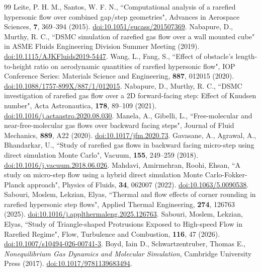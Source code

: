 \documentclass[aip,pof,preprint,notitlepage,floatfix,amsmath,amssymb]{revtex4-2}
\begin{document}
\begin{thebibliography}{99}
 Leite, P. H. M., Santos, W. F. N., ``Computational analysis of a rarefied hypersonic flow over combined gap/step geometries", Advances in Aerospace Sciences, \textbf{7}, 369--394 (2015). \href{https://doi.org/10.1051/eucass/201507369}{doi:10.1051/eucass/201507369}.
 Nabapure, D., Murthy, R. C., ``DSMC simulation of rarefied gas flow over a wall mounted cube" in ASME Fluids Engineering Division Summer Meeting (2019). \href{https://doi.org/10.1115/AJKFluids2019-5447}{doi:10.1115/AJKFluids2019-5447}.
 Wang, L., Fang, S., ``Effect of obstacle's length-to-height ratio on aerodynamic quantities of rarefied hypersonic flow", IOP Conference Series: Materials Science and Engineering, \textbf{887}, 012015 (2020). \href{https://doi.org/10.1088/1757-899X/887/1/012015}{doi:10.1088/1757-899X/887/1/012015}.
 Nabapure, D., Murthy, R. C., ``DSMC investigation of rarefied gas flow over a 2D forward-facing step: Effect of Knudsen number", Acta Astronautica, \textbf{178}, 89--109 (2021). \href{https://doi.org/10.1016/j.actaastro.2020.08.030}{doi:10.1016/j.actaastro.2020.08.030}.
 Manela, A., Gibelli, L., ``Free-molecular and near-free-molecular gas flows over backward facing steps", Journal of Fluid Mechanics, \textbf{889}, A22 (2020). \href{https://doi.org/10.1017/jfm.2020.73}{doi:10.1017/jfm.2020.73}.
 Gavasane, A., Agrawal, A., Bhandarkar, U., ``Study of rarefied gas flows in backward facing micro-step using direct simulation Monte Carlo", Vacuum, \textbf{155}, 249--259 (2018). \href{https://doi.org/10.1016/j.vacuum.2018.06.026}{doi:10.1016/j.vacuum.2018.06.026}.
 Mahdavi, Amirmehran, Roohi, Ehsan, ``A study on micro-step flow using a hybrid direct simulation Monte Carlo-Fokker-Planck approach", Physics of Fluids, \textbf{34}, 062007 (2022). \href{https://doi.org/10.1063/5.0090538}{doi:10.1063/5.0090538}.
 Sabouri, Moslem, Lekzian, Elyas, ``Thermal and flow effects of corner rounding in rarefied hypersonic step flows", Applied Thermal Engineering, \textbf{274}, 126763 (2025). \href{https://doi.org/10.1016/j.applthermaleng.2025.126763}{doi:10.1016/j.applthermaleng.2025.126763}.
 Sabouri, Moslem, Lekzian, Elyas, ``Study of Triangle-shaped Protrusions Exposed to High-speed Flow in Rarefied Regime", Flow, Turbulence and Combustion, \textbf{116}, 47 (2026). \href{https://doi.org/10.1007/s10494-026-00741-3}{doi:10.1007/s10494-026-00741-3}.
 Boyd, Iain D., Schwartzentruber, Thomas E., \emph{Nonequilibrium Gas Dynamics and Molecular Simulation}, Cambridge University Press (2017). \href{https://doi.org/10.1017/9781139683494}{doi:10.1017/9781139683494}.

\end{thebibliography}
\end{document}
